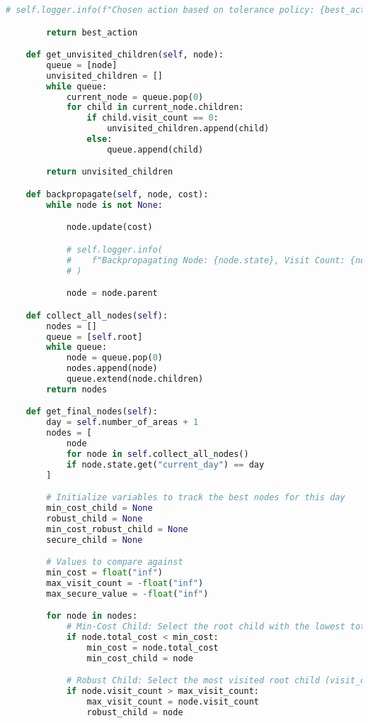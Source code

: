 \begin{lstlisting}[language = Python]
        # self.logger.info(f"Chosen action based on tolerance policy: {best_action}")

        return best_action

    def get_unvisited_children(self, node):
        queue = [node]
        unvisited_children = []
        while queue:
            current_node = queue.pop(0)
            for child in current_node.children:
                if child.visit_count == 0:
                    unvisited_children.append(child)
                else:
                    queue.append(child)

        return unvisited_children

    def backpropagate(self, node, cost):
        while node is not None:

            node.update(cost)

            # self.logger.info(
            #    f"Backpropagating Node: {node.state}, Visit Count: {node.visit_count}, Total Cost: {node.total_cost}, Scores: {node.scores}"
            # )

            node = node.parent

    def collect_all_nodes(self):
        nodes = []
        queue = [self.root]
        while queue:
            node = queue.pop(0)
            nodes.append(node)
            queue.extend(node.children)
        return nodes

    def get_final_nodes(self):
        day = self.number_of_areas + 1
        nodes = [
            node
            for node in self.collect_all_nodes()
            if node.state.get("current_day") == day
        ]

        # Initialize variables to track the best nodes for this day
        min_cost_child = None
        robust_child = None
        min_cost_robust_child = None
        secure_child = None

        # Values to compare against
        min_cost = float("inf")
        max_visit_count = -float("inf")
        max_secure_value = -float("inf")

        for node in nodes:
            # Min-Cost Child: Select the root child with the lowest total_cost
            if node.total_cost < min_cost:
                min_cost = node.total_cost
                min_cost_child = node

            # Robust Child: Select the most visited root child (visit_count)
            if node.visit_count > max_visit_count:
                max_visit_count = node.visit_count
                robust_child = node


\end{lstlisting}
